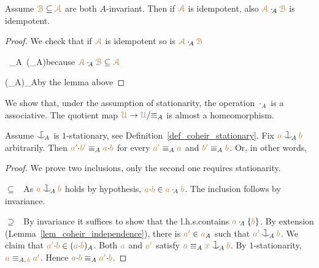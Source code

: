 \documentclass[creche.tex]{subfiles}
\begin{document}
\begin{corollary}\label{corol_min_idempotent}
Assume ${\color{brown}\EuScript B}\subseteq{\color{brown}{\EuScript A}}$ are both $A$-invariant.
Then if ${\color{brown}{\EuScript A}}$ is idempotent,
also ${\color{brown}{\EuScript A}}\cdot_{\!A}{\color{brown}\EuScript B}$ is idempotent.
\end{corollary}
\begin{proof}
We check that if ${\color{brown}{\EuScript A}}$ is idempotent so is ${\color{brown}{\EuScript A}}\cdot_{\!A}{\color{brown}\EuScript B}$

    {\subseteq}
    {\mrA\ \cdot_{\!A}\ \big(\mrA\cdot_{\!A}\mrB\big)}\hfill because ${\color{brown}{\EuScript A}}\cdot_{\!A}{\color{brown}\EuScript B}\subseteq{\color{brown}{\EuScript A}}$

\ceq{}
    {\subseteq}
    {\big(\mrA\cdot_{\!A}\mrA\big)\cdot_{\!A}\mrB}\hfill by the lemma above

\end{proof}

We show that, under the assumption of stationarity,
the operation $\cdot_{\!A}$ is a associative.
The quotient map ${\color{brown}\EuScript U}\to{\color{brown}\EuScript U}/{\equiv_A}$ is almost a homeomorphism.


\begin{proposition}\label{prop_orbits_main}
Assume $\nonforkc_{\!A}$ is $1$-stationary,
see Definition~\ref{def_coheir_stationary}.
Fix ${\mr a}\cnonfork_{\!A}{\mr b}$ arbitrarily.
Then ${\color{brown} a'}{\cdot}{\color{brown} b'}\equiv_A{\color{brown} a}{\cdot}{\color{brown} b}$ for every ${\color{brown} a'}\equiv_A{\color{brown} a}$ and  ${\color{brown} b'}\equiv_A{\color{brown} b}$. Or, in other words,

\end{proposition}
\begin{proof} 
We prove two inclusions,
only the second one requires stationarity.

$\subseteq$ \ As ${\mr a}\cnonfork_{\!A}{\mr b}$ holds by hypothesis,
${\color{brown} a}{\cdot}{\color{brown} b}\in{\color{brown}a}\cdot_{\!A}{\color{brown} b}$.
The inclusion follows by invariance.

$\supseteq$ \ By invariance it suffices to show that 
the l.h.s.\@ contains ${\color{brown} a}\cdot_{\!A}\{{\color{brown} b}\}$.
By extension (Lemma~\ref{lem_coheir_independence}), there is ${\color{brown} a'}\in{\color{brown}a}_A$ such that ${\mr a'}\cnonfork_{\!A}{\mr b}$.
We claim that ${\color{brown} a'}{\cdot}{\color{brown} b}\in({\color{brown} a}{\cdot}{\color{brown} b})_A$.
Both ${\color{brown} a}$ and ${\color{brown} a'}$ satisfy ${\mr a}\equiv_A{\mr x}\cnonfork_{\!A}{\mr b}$.
By $1$-stationarity,
${\color{brown} a}\equiv_{A,\,{\color{brown} b}}{\color{brown} a'}$.
Hence ${\color{brown} a}{\cdot}{\color{brown} b}\equiv_A{\color{brown} a'}{\cdot}{\color{brown} b}$.
\end{proof}
\end{document}
